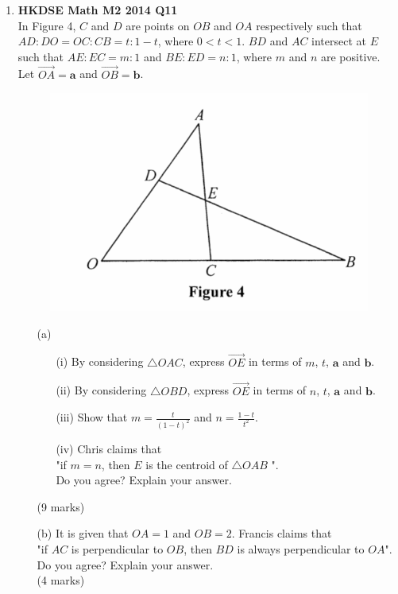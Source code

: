 \documentclass[12pt]{article}
\begin{document}
\begin{enumerate}
	\item \textbf{HKDSE Math M2 2014 Q11}\\
	In Figure 4, $C$ and $D$ are points on $OB$ and $OA$ respectively such that $AD : DO = OC : CB = t : 1-t$, where $0 < t < 1$. $BD$ and $AC$ intersect at $E$ such that $AE : EC = m : 1 $ and $BE : ED = n : 1 $, where $m$ and $n$ are positive. Let $\overrightarrow{OA} = \textbf{a}$ and $\overrightarrow{OB} = \textbf{b}$. 
	\begin{figure}[H]
		\centering
		\includegraphics[width = .5\linewidth]{2014Figure4}
	\end{figure}
	\begin{enumerate}
		\item [(a)]
		\begin{enumerate}
			\item [(i)]By considering $\triangle OAC$, express $\overrightarrow{OE}$ in terms of $m$, $t$, $\textbf{a}$ and $\textbf{b}$.
			\item [(ii)]By considering $\triangle OBD$, express $\overrightarrow{OE}$ in terms of $n$, $t$, $\textbf{a}$ and $\textbf{b}$.
			\item [(iii)]Show that $\displaystyle m = \frac{t}{(1-t)^2}$ and $\displaystyle n = \frac{1-t}{t^2}$. 
			\item [(iv)]Chris claims that \\
				"if $m = n$, then $E$ is the centroid of $\triangle OAB$ ".\\
				Do you agree? Explain your answer.
		\end{enumerate}
		(9 marks)
		\item [(b)]It is given that $OA = 1$ and $OB = 2$. Francis claims that \\
			"if $AC$ is perpendicular to $OB$, then $BD$ is always perpendicular to $OA$".\\
			Do you agree? Explain your answer. \\(4 marks)
	\end{enumerate}


\end{enumerate}
\end{document}
